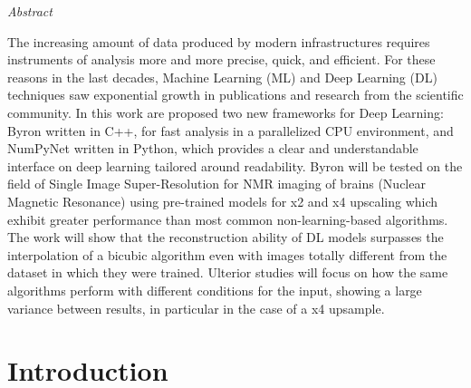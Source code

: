 \documentclass[12pt,a4paper]{report}
\begin{document}
\newpage

\vspace*{125px}
\LARGE\textit{Abstract}
\normalsize
\vspace{2mm}

The increasing amount of data produced by modern infrastructures requires instruments of analysis more and more precise, quick, and efficient. 
For these reasons in the last decades, Machine Learning (ML) and Deep Learning (DL) techniques saw exponential growth in publications and research from the scientific community.
In this work are proposed two new frameworks for Deep Learning: Byron written in C++, for fast analysis in a parallelized CPU environment, and NumPyNet written in Python, which provides a clear and understandable interface on deep learning tailored around readability. 
Byron will be tested on the field of Single Image Super-Resolution for NMR imaging of brains (Nuclear Magnetic Resonance) using pre-trained models for x2 and x4 upscaling which exhibit greater performance than most common non-learning-based algorithms. 
The work will show that the reconstruction ability of DL models surpasses the interpolation of a bicubic algorithm even with images totally different from the dataset in which they were trained. 
Ulterior studies will focus on how the same algorithms perform with different conditions for the input, showing a large variance between results, in particular in the case of a x4 upsample. 

\newpage
\normalsize 

\tableofcontents

\chapter{Introduction}
\end{document}
